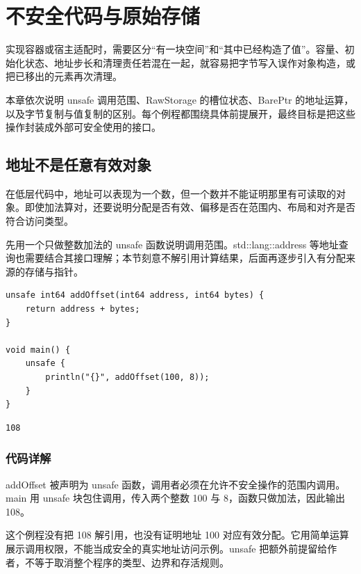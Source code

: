 \chapter{不安全代码与原始存储}
\label{ch:23}

实现容器或宿主适配时，需要区分“有一块空间”和“其中已经构造了值”。容量、初始化状态、地址步长和清理责任若混在一起，就容易把字节写入误作对象构造，或把已移出的元素再次清理。

本章依次说明 unsafe 调用范围、RawStorage 的槽位状态、BarePtr 的地址运算，以及字节复制与值复制的区别。每个例程都围绕具体前提展开，最终目标是把这些操作封装成外部可安全使用的接口。

\section{地址不是任意有效对象}

在低层代码中，地址可以表现为一个数，但一个数并不能证明那里有可读取的对象。即使加法算对，还要说明分配是否有效、偏移是否在范围内、布局和对齐是否符合访问类型。

先用一个只做整数加法的 unsafe 函数说明调用范围。std::lang::address 等地址查询也需要结合其接口理解；本节刻意不解引用计算结果，后面再逐步引入有分配来源的存储与指针。

\par
\medskip
\begin{lstlisting}[style=chali]
unsafe int64 addOffset(int64 address, int64 bytes) {
    return address + bytes;
}

void main() {
    unsafe {
        println("{}", addOffset(100, 8));
    }
}
\end{lstlisting}
\par
\medskip

\par
\medskip
\begin{lstlisting}[style=out]
108
\end{lstlisting}
\par
\medskip

\subsection*{代码详解}

addOffset 被声明为 unsafe 函数，调用者必须在允许不安全操作的范围内调用。main 用 unsafe 块包住调用，传入两个整数 100 与 8，函数只做加法，因此输出 108。

这个例程没有把 108 解引用，也没有证明地址 100 对应有效分配。它用简单运算展示调用权限，不能当成安全的真实地址访问示例。unsafe 把额外前提留给作者，不等于取消整个程序的类型、边界和存活规则。

